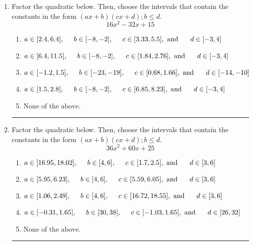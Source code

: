 \documentclass[14pt]{extbook}
\newcommand{\litem}[1]{\item#1\hspace*{-1cm}\rule{\textwidth}{0.4pt}}
\begin{document}
\begin{enumerate}
{\begin{enumerate}[label=\Alph*.]
\end{enumerate} }
\litem{
Factor the quadratic below. Then, choose the intervals that contain the constants in the form $(ax+b)(cx+d); b \leq d.$\[ 16x^{2} -32 x + 15 \]\begin{enumerate}[label=\Alph*.]
\item \( a \in [2.4, 6.4], \hspace*{5mm} b \in [-8, -2], \hspace*{5mm} c \in [3.33, 5.5], \text{ and } \hspace*{5mm} d \in [-3, 4] \)
\item \( a \in [6.4, 11.5], \hspace*{5mm} b \in [-8, -2], \hspace*{5mm} c \in [1.84, 2.76], \text{ and } \hspace*{5mm} d \in [-3, 4] \)
\item \( a \in [-1.2, 1.5], \hspace*{5mm} b \in [-23, -19], \hspace*{5mm} c \in [0.68, 1.66], \text{ and } \hspace*{5mm} d \in [-14, -10] \)
\item \( a \in [1.5, 2.8], \hspace*{5mm} b \in [-8, -2], \hspace*{5mm} c \in [6.85, 8.23], \text{ and } \hspace*{5mm} d \in [-3, 4] \)
\item \( \text{None of the above.} \)

\end{enumerate} }
\litem{
Factor the quadratic below. Then, choose the intervals that contain the constants in the form $(ax+b)(cx+d); b \leq d.$\[ 36x^{2} +60 x + 25 \]\begin{enumerate}[label=\Alph*.]
\item \( a \in [16.95, 18.02], \hspace*{5mm} b \in [4, 6], \hspace*{5mm} c \in [1.7, 2.5], \text{ and } \hspace*{5mm} d \in [3, 6] \)
\item \( a \in [5.95, 6.23], \hspace*{5mm} b \in [4, 6], \hspace*{5mm} c \in [5.59, 6.05], \text{ and } \hspace*{5mm} d \in [3, 6] \)
\item \( a \in [1.06, 2.49], \hspace*{5mm} b \in [4, 6], \hspace*{5mm} c \in [16.72, 18.55], \text{ and } \hspace*{5mm} d \in [3, 6] \)
\item \( a \in [-0.31, 1.65], \hspace*{5mm} b \in [30, 38], \hspace*{5mm} c \in [-1.03, 1.65], \text{ and } \hspace*{5mm} d \in [26, 32] \)
\item \( \text{None of the above.} \)


\end{enumerate}}
\end{enumerate}
\end{document}

